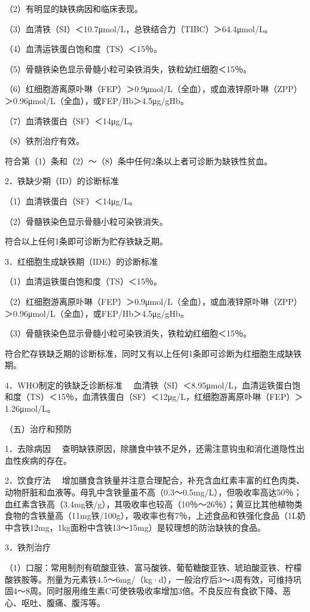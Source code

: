 （2）有明显的缺铁病因和临床表现。

（3）血清铁（SI）＜10.7μmol/L，总铁结合力（TIBC）＞64.4μmol/L。

（4）血清运铁蛋白饱和度（TS）＜15％。

（5）骨髓铁染色显示骨髓小粒可染铁消失，铁粒幼红细胞＜15％。

（6）红细胞游离原卟啉（FEP）＞0.9μmol/L（全血），或血液锌原卟啉（ZPP）＞0.96μmol/L（全血），或FEP/Hb＞4.5μg/gHb。

（7）血清铁蛋白（SF）＜14μg/L。

（8）铁剂治疗有效。

符合第（1）条和（2）～（8）条中任何2条以上者可诊断为缺铁性贫血。

{2．铁缺少期（ID）的诊断标准}

（1）血清铁蛋白（SF）＜14μg/L。

（2）骨髓铁染色显示骨髓小粒可染铁消失。

符合以上任何1条即可诊断为贮存铁缺乏期。

{3．红细胞生成缺铁期（IDE）的诊断标准}

（1）血清运铁蛋白饱和度（TS）＜15％。

（2）红细胞游离原卟啉（FEP）＞0.9μmol/L（全血），或血液锌原卟啉（ZPP）＞0.96μmol/L（全血），或FEP/Hb＞4.5μg/gHb。

（3）骨髓铁染色显示骨髓小粒可染铁消失，铁粒幼红细胞＜15％。

符合贮存铁缺乏期的诊断标准，同时又有以上任何1条即可诊断为红细胞生成缺铁期。

{4．WHO制定的铁缺乏诊断标准}
　血清铁（SI）＜8.95μmol/L，血清运铁蛋白饱和度（TS）＜15％，血清铁蛋白（SF）＜12μg/L，红细胞游离原卟啉（FEP）＞1.26μmol/L。

（五）治疗和预防

{1．去除病因}
　查明缺铁原因，除膳食中铁不足外，还需注意钩虫和消化道隐性出血性疾病的存在。

{2．饮食疗法}
　增加膳食含铁量并注意合理配合，补充含血红素丰富的红色肉类、动物肝脏和血液等。母乳中含铁量虽不高（0.3～0.5mg/L），但吸收率高达50％；血红素含铁高（3.4mg铁/g），其吸收率也较高（10％～26％）；黄豆比其他植物类食物的含铁量高（11mg铁/100g），吸收率也有7％，上述食品和铁强化食品（1L奶中含铁12mg，1kg面粉中含铁13～15mg）是较理想的防治缺铁的食品。

{3．铁剂治疗}

（1）口服：常用制剂有硫酸亚铁、富马酸铁、葡萄糖酸亚铁、琥珀酸亚铁、柠檬酸铁胺等。剂量为元素铁4.5～6mg/（kg·d），一般治疗后3～4周有效，可维持巩固4～8周。同时服用维生素C可使铁吸收率增加3倍。不良反应有食欲下降、恶心、呕吐、腹痛、腹泻等。

